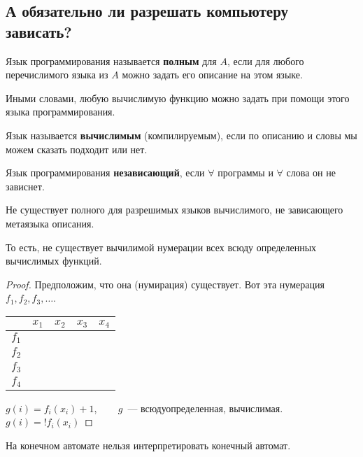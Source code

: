 \subsection{А обязательно ли разрешать компьютеру зависать?}

\begin{definition}
    Язык программирования называется \textbf{полным} для $A$, если для любого перечислимого языка из $A$ можно задать его описание на этом языке.

    Иными словами, любую вычислимую функцию можно задать при помощи этого языка программирования.
\end{definition}

\begin{definition}
    Язык называется \textbf{вычислимым} (компилируемым), если по описанию и словы мы можем сказать подходит или нет.
\end{definition}

\begin{definition}
    Язык программирования \textbf{независающий}, если $\forall$ программы и $\forall$ слова он не зависнет.
\end{definition}

\begin{theorem}
    Не существует полного для разрешимых языков вычислимого, не зависающего метаязыка описания.


    То есть, не существует вычилимой нумерации всех всюду определенных вычислимых функций.
\end{theorem}

\begin{proof}
    Предположим, что она (нумирация) существует. Вот эта нумерация $f_1, f_2, f_3, \dots$.
    \begin{tabular}{c|c c c c}
         & $x_1$ & $x_2$ & $x_3$ & $x_4$  \\\hline
        $f_1$ &&&&\\
        $f_2$ &&&&\\
        $f_3$ &&&&\\
        $f_4$ &&&&
    \end{tabular}

    $g(i) = f_i(x_i) + 1$, ~~~ $g$~--- всюдуопределенная, вычислимая.\\
    $g(i)  = ! f_i(x_i)$
\end{proof}

\begin{corollary}
    На конечном автомате нельзя интерпретировать конечный автомат.
\end{corollary}


